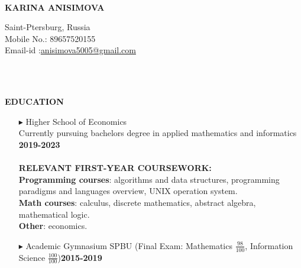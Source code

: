 \documentclass[a4paper,10pt]{article}
\begin{document}
	\hspace{0.5cm}\\[-0.2cm]
	\begin{minipage}{0.5\textwidth}
		\begin{flushleft}
			\huge \textbf{\* \* KARINA ANISIMOVA} 
			\normalsize
		\end{flushleft}
	\end{minipage}
	\begin{minipage}{0.51\textwidth}
		\begin{flushright}
			\textcolor[gray]{0.3}{
				\indent Saint-Ptersburg, Russia\\
				\indent Mobile No.: 89657520155  \\
				\indent Email-id :\href{mailto:anisimova5005@gmail.com} {anisimova5005@gmail.com}\\  	
			}
		\end{flushright}
	\end{minipage}
	\\ \\
	
	
	
	\colorbox{magicmint}{
		\begin{minipage}{0.96\textwidth}
			\vphantom{.}
			\textbf{EDUCATION}
		\end{minipage}
	}
	
	\begin{itemize}
		\item [$\blacktriangleright$]  Higher School of Economics\\ Currently pursuing bachelors degree in applied mathematics and informatics \hspace{2.8cm} \textbf{2019-2023} \\ \\
		\textbf{RELEVANT FIRST-YEAR COURSEWORK:}\\
		\textbf{Programming courses}{: algorithms and data structures, programming paradigms and languages overview, UNIX operation system.}\\
		\textbf{Math courses}{: calculus, discrete mathematics, abstract algebra, mathematical logic.}\\
		\textbf{Other}{: economics.}
		\item[$\blacktriangleright$]  Academic Gymnasium SPBU (Final Exam: Mathematics $\frac{98}{100}$, Information Science $\frac{100}{100}$)\hspace{1.7cm}\textbf{2015-2019}
	\end{itemize}
	
\end{document}
